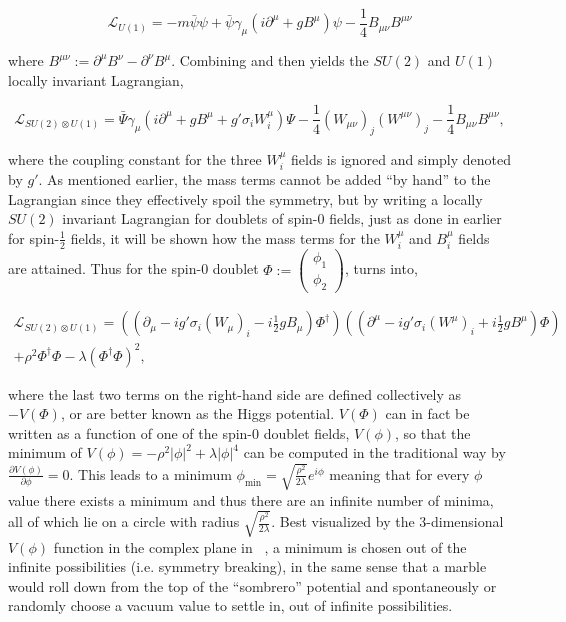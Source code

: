 \begin{equation}
  \mathcal{L}_{U(1)} = -m\bar{\psi}\psi + \bar{\psi}\gamma_\mu(i\partial^\mu + gB^\mu)\psi - \frac{1}{4}B_{\mu\nu}B^{\mu\nu}
  \label{eq:U1}
\end{equation} 

where $B^{\mu\nu} := \partial^\mu B^\nu - \partial^\nu B^\mu$. Combining  and  then yields the $SU(2)$ and $U(1)$ locally invariant Lagrangian,

\begin{equation}
  \mathcal{L}_{SU(2)\otimes U(1)} = \bar{\Psi}\gamma_\mu(i\partial^\mu + gB^\mu + g'\sigma_i W^\mu_i)\Psi - \frac{1}{4}(W_{\mu\nu})_{j}(W^{\mu\nu})_{j}-\frac{1}{4}B_{\mu\nu}B^{\mu\nu},
  \label{eq:SU2cU1}
\end{equation}

where the coupling constant for the three $W^\mu_i$ fields is ignored and simply denoted by $g'$. As mentioned earlier, the mass terms cannot be added ``by hand'' to the Lagrangian since they effectively spoil the symmetry, but by writing a locally $SU(2)$ invariant Lagrangian for doublets of spin-0 fields, just as done in  earlier for spin-$\frac{1}{2}$ fields, it will be shown how the mass terms for the $W^\mu_i$ and $B^\mu_i$ fields are attained. Thus for the spin-0 doublet $\Phi := \begin{pmatrix} \phi_1 \\ \phi_2 \end{pmatrix}$,  turns into,

\begin{equation}
  \begin{aligned}
  \mathcal{L}_{SU(2)\otimes U(1)} = ((\partial_\mu - ig'\sigma_i(W_\mu)_i - i\frac{1}{2}gB_\mu)\Phi^{\dagger})((\partial^\mu - ig'\sigma_i(W^\mu)_i + i\frac{1}{2}gB^\mu)\Phi) \\
  + \rho^2\Phi^\dagger\Phi - \lambda(\Phi^\dagger\Phi)^2,
  \end{aligned}
\label{eq:b4symbreak}
\end{equation}

where the last two terms on the right-hand side are defined collectively as $-V(\Phi)$, or are better known as the Higgs potential. $V(\Phi)$ can in fact be written as a function of one of the spin-0 doublet fields, $V(\phi)$, so that the minimum of $V(\phi) = -\rho^2|\phi|^2 + \lambda|\phi|^4$ can be computed in the traditional way by $\frac{\partial V(\phi)}{\partial\phi} = 0$. This leads to a minimum $\phi_{\mathrm{min}} = \sqrt{\frac{\rho^2}{2\lambda}}e^{i\phi}$ meaning that for every $\phi$ value there exists a minimum and thus there are an infinite number of minima, all of which lie on a circle with radius $\sqrt{\frac{\rho^2}{2\lambda}}$. Best visualized by the 3-dimensional $V(\phi)$ function in the complex plane in ~, a minimum is chosen out of the infinite possibilities (i.e. symmetry breaking), in the same sense that a marble would roll down from the top of the ``sombrero'' potential and spontaneously or randomly choose a vacuum value to settle in, out of infinite possibilities. 

